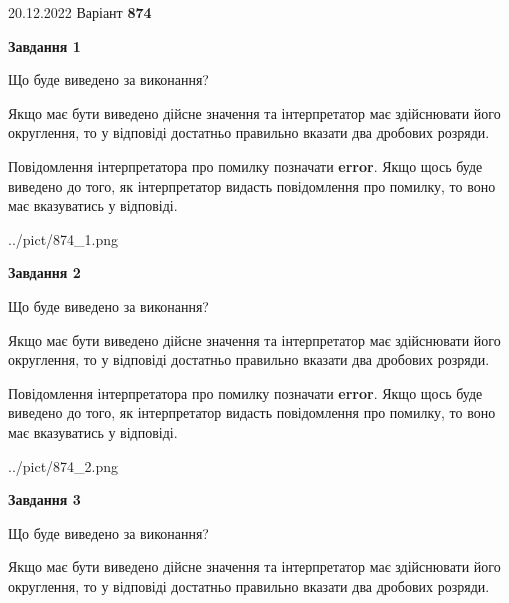 \documentclass[12pt, ukrainian]{article}
\begin{document}
{20.12.2022 Варіант \No \textbf { 874 }\par}
{
\begin {Large}

{\begin {center}\textbf{Завдання 1}\end {center}}\par
Що буде виведено за виконання? \par

Якщо має бути виведено дійсне значення та інтерпретатор має здійснювати його округлення, 
то у відповіді достатньо правильно вказати два дробових розряди.

Повідомлення інтерпретатора про помилку позначати \textbf{error}.
Якщо щось буде виведено до того, як інтерпретатор видасть повідомлення про помилку, 
то воно має вказуватись у відповіді. \par

\begin{center}
	{../pict/874_1.png}
\end{center}
\newpage

{\begin {center}\textbf{Завдання 2}\end {center}}\par
Що буде виведено за виконання? \par

Якщо має бути виведено дійсне значення та інтерпретатор має здійснювати його округлення, 
то у відповіді достатньо правильно вказати два дробових розряди.

Повідомлення інтерпретатора про помилку позначати \textbf{error}.
Якщо щось буде виведено до того, як інтерпретатор видасть повідомлення про помилку, 
то воно має вказуватись у відповіді. \par

\begin{center}
	{../pict/874_2.png}
\end{center}
\newpage

{\begin {center}\textbf{Завдання 3}\end {center}}\par
Що буде виведено за виконання? \par

Якщо має бути виведено дійсне значення та інтерпретатор має здійснювати його округлення, 
то у відповіді достатньо правильно вказати два дробових розряди.


\end{Large}}
\end{document}
